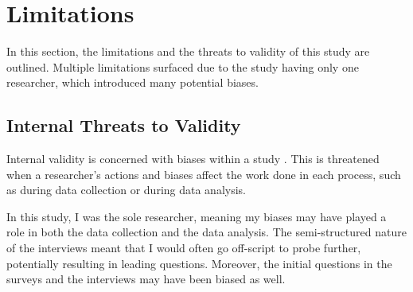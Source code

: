 


\section{Limitations}
In this section, the limitations and the threats to validity of this study are outlined. Multiple limitations surfaced due to the study having only one researcher, which introduced many potential biases.

\subsection{Internal Threats to Validity}
Internal validity is concerned with biases within a study \cite{creswell2013research}. This is threatened when a researcher's actions and biases affect the work done in each process, such as during data collection or during data analysis.

In this study, I was the sole researcher, meaning my biases may have played a role in both the data collection and the data analysis. The semi-structured nature of the interviews meant that I would often go off-script to probe further, potentially resulting in leading questions. Moreover, the initial questions in the surveys and the interviews may have been biased as well.

